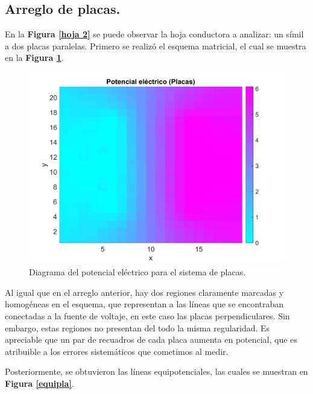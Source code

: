 \documentclass[letterpaper, 11 pt]{article}
\begin{document}
\begin{multicols}{2}
\subsection*{Arreglo de placas.}

En la \textbf{Figura \ref{hoja 2}} se puede observar la hoja conductora  a analizar: un símil a dos placas paralelas. Primero se realizó el esquema matricial, el cual se muestra en la \textbf{Figura \ref{popla}}.

\begin{figure}[H]
   \centering
    \captionsetup{justification=centering,margin=0.5cm}
    \includegraphics[scale=0.05]{placas.jpg}
    \caption{Diagrama del potencial eléctrico para el sistema de placas.}
    \label{popla}
\end{figure}

Al igual que en el arreglo anterior, hay dos regiones claramente marcadas y homogéneas en el esquema, que representan a las líneas que se encontraban conectadas a la fuente de voltaje, en este caso las placas perpendiculares. Sin embargo, estas regiones no presentan del todo la misma regularidad. Es apreciable que un par de recuadros de cada placa aumenta en potencial, que es atribuible a los errores sistemáticos que cometimos al medir.

Posteriormente, se obtuvieron las líneas equipotenciales, las cuales se muestran en \textbf{Figura \ref{equipla}}.


\end{multicols}
\end{document}
